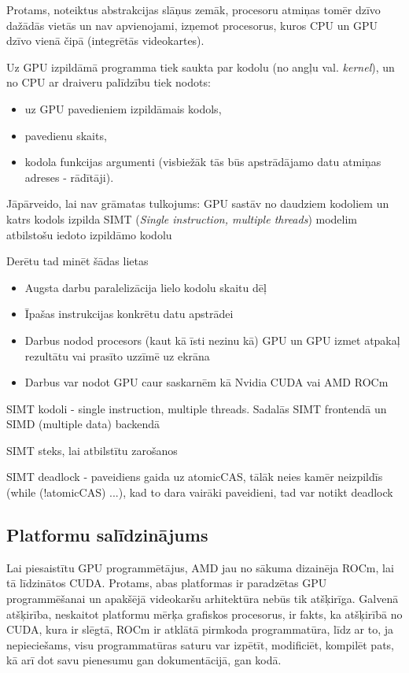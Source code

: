 \documentclass[12pt]{report}%
\theoremstyle{definition}
\begin{document}
Protams, noteiktus abstrakcijas slāņus zemāk, procesoru atmiņas tomēr dzīvo dažādās vietās un nav apvienojami,
izņemot procesorus, kuros CPU un GPU dzīvo vienā čipā (integrētās videokartes).

Uz GPU izpildāmā programma tiek saukta par kodolu (no angļu val. \textit{kernel}), un no CPU ar draiveru
palīdzību tiek nodots:
\begin{itemize}
    \item uz GPU pavedieniem izpildāmais kodols,
    \item pavedienu skaits,
    \item kodola funkcijas argumenti (visbiežāk tās būs apstrādājamo datu atmiņas adreses - rādītāji).
\end{itemize}

Jāpārveido, lai nav grāmatas tulkojums:    GPU sastāv no daudziem kodoliem un katrs kodols izpilda
SIMT (\textit{Single instruction, multiple threads}) modelim atbilstošu iedoto izpildāmo kodolu




Derētu tad minēt šādas lietas
\begin{itemize}
   \item Augsta darbu paralelizācija lielo kodolu skaitu dēļ
   \item Īpašas instrukcijas konkrētu datu apstrādei
   \item Darbus nodod procesors (kaut kā īsti nezinu kā) GPU un GPU izmet atpakaļ rezultātu vai prasīto uzzīmē uz ekrāna
   \item Darbus var nodot GPU caur saskarnēm kā Nvidia CUDA vai AMD ROCm
\end{itemize}

SIMT kodoli - single instruction, multiple threads. Sadalās SIMT frontendā un SIMD (multiple data) backendā

SIMT steks, lai atbilstītu zarošanos

SIMT deadlock - paveidiens gaida uz atomicCAS, tālāk neies kamēr neizpildīs (while (!atomicCAS) ...), kad to dara vairāki paveidieni, tad var notikt deadlock

\begin{center}
\chapter{Platformu salīdzinājums}
\end{center}
Lai piesaistītu GPU programmētājus, AMD jau no sākuma dizainēja ROCm, lai tā līdzinātos CUDA. Protams,
abas platformas ir paradzētas GPU programmēšanai un apakšējā videokaršu arhitektūra nebūs tik atšķirīga.
Galvenā atšķirība, neskaitot platformu mērķa grafiskos procesorus, ir fakts, ka atšķirībā no CUDA, kura
ir slēgtā, ROCm ir atklātā pirmkoda programmatūra, līdz ar to, ja nepieciešams, visu programmatūras saturu 
var izpētīt, modificiēt, kompilēt pats, kā arī dot savu pienesumu gan dokumentācijā, gan kodā.\cite{what_is_ROCM}
\end{document}
